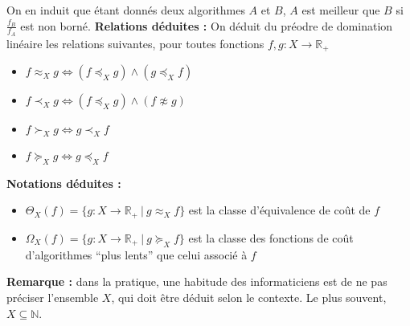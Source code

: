 \documentclass[../../../main.tex]{subfiles}
\begin{document}
On en induit que étant donnés deux algorithmes $A$ et $B$, $A$ est meilleur que $B$ si $\frac{f_B}{f_A}$ est non borné.
\textbf{Relations déduites :} On déduit du préodre de domination linéaire les relations suivantes, pour toutes fonctions $f, g:X\rightarrow \mathbb{R}_+$
\begin{itemize}
	\item $f\approx_X g \Leftrightarrow (f\preceq_X g) \wedge (g\preceq_X f)$
	\item $f\prec_X g \Leftrightarrow (f\preceq_X g) \wedge (f \not\approx g)$
	\item $f\succ_X g \Leftrightarrow g\prec_X f$
	\item $f\succeq_X g \Leftrightarrow g\preceq_X f$
\end{itemize}
\textbf{Notations déduites :} 
\begin{itemize}
	\item $\Theta_X(f) = \{g:X\rightarrow \mathbb{R}_+\ |\ g\approx_X f\}$ est la classe d'équivalence de coût de $f$
	\item $\Omega_X(f) = \{g:X\rightarrow \mathbb{R}_+\ |\ g\succeq_X f\}$ est la classe des fonctions de coût d'algorithmes ``plus lents'' que celui associé à $f$
\end{itemize}
\textbf{Remarque :} dans la pratique, une habitude des informaticiens est de ne pas préciser l'ensemble $X$, qui doit être déduit selon le contexte. Le plus souvent, $X\subseteq \mathbb{N}$.
\end{document}
